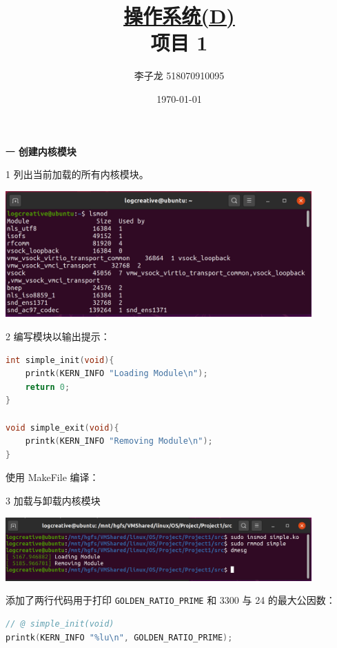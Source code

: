 \documentclass[12pt,a4paper]{article}
\newenvironment{problems}{\begin{list}{}{\renewcommand{\makelabel}[1]{\textbf{##1}\hfil}}}{\end{list}}
\newenvironment{steps}{\begin{list}{}{\renewcommand{\makelabel}[1]{##1.\hfil}}}{\end{list}}
\providecommand{\code}[2]{}
\begin{document}
\title{\normalsize \underline{操作系统(D)}\\\LARGE 项目 1}
\author{李子龙 518070910095}
\date{\today}
\maketitle

\begin{problems}
    \item[一] \textbf{创建内核模块}
    \begin{steps}
        \item[1] 列出当前加载的所有内核模块。
        
        \includegraphics[width=0.88\textwidth]{lsmod.png}

        \item[2] 编写模块以输出提示：

        \begin{lstlisting}[language=c]
int simple_init(void){
    printk(KERN_INFO "Loading Module\n");
    return 0;
}

void simple_exit(void){
    printk(KERN_INFO "Removing Module\n");
}
        \end{lstlisting}

        使用 MakeFile 编译：
        \code{src/Makefile}{}

        \item[3] 加载与卸载内核模块
        
        \includegraphics[width=0.88\textwidth]{insmod.png}

        添加了两行代码用于打印 \texttt{GOLDEN\_RATIO\_PRIME} 和 3300 与 24 的最大公因数：

        \begin{lstlisting}[language=c]
// @ simple_init(void)
printk(KERN_INFO "%lu\n", GOLDEN_RATIO_PRIME);


\end{lstlisting}
\end{steps}
\end{problems}
\end{document}
